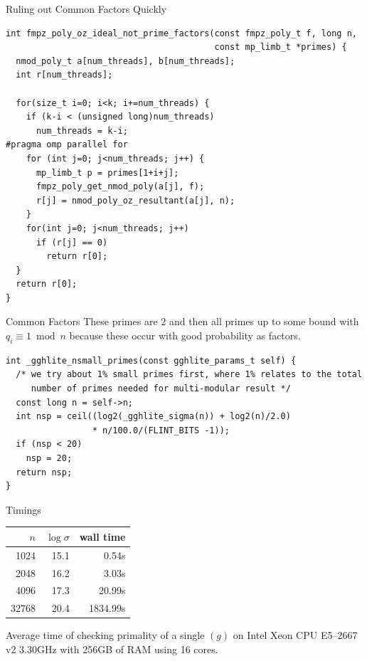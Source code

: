 \documentclass[presentation,smaller]{beamer}
\begin{document}
\begin{frame}[fragile,label={sec:orgheadline28}]{Ruling out Common Factors Quickly}
 \lstset{language=C,label= ,caption= ,captionpos=b,numbers=none}
\begin{lstlisting}
int fmpz_poly_oz_ideal_not_prime_factors(const fmpz_poly_t f, long n,
                                         const mp_limb_t *primes) {
  nmod_poly_t a[num_threads], b[num_threads];
  int r[num_threads];

  for(size_t i=0; i<k; i+=num_threads) {
    if (k-i < (unsigned long)num_threads)
      num_threads = k-i;
#pragma omp parallel for
    for (int j=0; j<num_threads; j++) {
      mp_limb_t p = primes[1+i+j];
      fmpz_poly_get_nmod_poly(a[j], f);
      r[j] = nmod_poly_oz_resultant(a[j], n);
    }
    for(int j=0; j<num_threads; j++)
      if (r[j] == 0)
        return r[0];
  }
  return r[0];
}
\end{lstlisting}
\end{frame}

\begin{frame}[fragile,label={sec:orgheadline29}]{Common Factors}
 These primes are \(2\) and then all primes up to some bound with \(q_i \equiv 1 \bmod n\) because these occur with good probability as factors.

\lstset{language=C,label= ,caption= ,captionpos=b,numbers=none}
\begin{lstlisting}
int _gghlite_nsmall_primes(const gghlite_params_t self) {
  /* we try about 1% small primes first, where 1% relates to the total
     number of primes needed for multi-modular result */
  const long n = self->n;
  int nsp = ceil((log2(_gghlite_sigma(n)) + log2(n)/2.0)
                 * n/100.0/(FLINT_BITS -1));
  if (nsp < 20)
    nsp = 20;
  return nsp;
}
\end{lstlisting}
\end{frame}

\begin{frame}[label={sec:orgheadline30}]{Timings}
\begin{center}
\begin{tabular}{rrr}
\hline
\(n\) & \(\log σ\) & wall time\\
\hline
1024 & 15.1 & 0.54s\\
2048 & 16.2 & 3.03s\\
4096 & 17.3 & 20.99s\\
32768 & 20.4 & 1834.99s\\
\hline
\end{tabular}

\end{center}

Average time of checking primality of a single \((g)\) on Intel Xeon CPU E5--2667 v2 3.30GHz with 256GB of RAM using 16 cores.
\end{frame}
\end{document}

